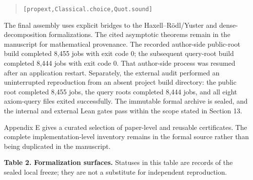 \documentclass[english,11pt,a4paper]{article}
\begin{document}
\begin{quote}
{\LeanSymbols\fontsize{8}{10}\selectfont
\noindent \nolinkurl{[propext,}\hspace{0.45em}\nolinkurl{Classical.choice,}\hspace{0.45em}\nolinkurl{Quot.sound]}\par
}
\end{quote}

The final assembly uses explicit bridges to the Haxell--Rödl/Yuster and
dense-decomposition formalizations. The cited asymptotic theorems remain
in the manuscript for mathematical provenance. The recorded author-side
public-root build completed 8,455 jobs with exit code 0; the subsequent
query-root build completed 8,444 jobs with exit code 0. That author-side
process was resumed after an application restart. Separately, the
external audit performed an uninterrupted reproduction from an absent
project build directory: the public root completed 8,455 jobs, the query
roots completed 8,444 jobs, and all eight axiom-query files exited
successfully. The immutable formal archive is sealed, and the internal
and external Lean gates pass within the scope stated in Section 13.

Appendix E gives a curated selection of paper-level and reusable
certificates. The complete implementation-level inventory remains in the
formal source rather than being duplicated in the manuscript.

\textbf{Table 2. Formalization surfaces.} Statuses in this table are
records of the sealed local freeze; they are not a substitute for
independent reproduction.
\end{document}
